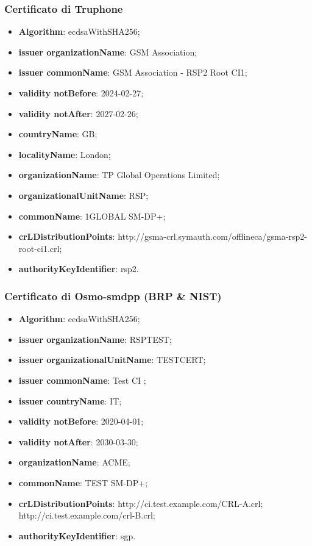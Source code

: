 \documentclass[10pt, oneside]{book}
\begin{document}
\subsubsection{Certificato di Truphone}
\begin{itemize}
\item \textbf{Algorithm}: ecdsaWithSHA256;
\item \textbf{issuer organizationName}: GSM Association;
\item \textbf{issuer commonName}: GSM Association - RSP2 Root CI1;
\item \textbf{validity notBefore}: 2024-02-27;
\item \textbf{validity notAfter}: 2027-02-26;
\item \textbf{countryName}: GB;
\item \textbf{localityName}: London;
\item \textbf{organizationName}: TP Global Operations Limited;
\item \textbf{organizationalUnitName}: RSP;
\item \textbf{commonName}: 1GLOBAL SM-DP+;
\item \textbf{crLDistributionPoints}: http://gsma-crl.symauth.com/offlineca/gsma-rsp2-root-ci1.crl;
\item \textbf{authorityKeyIdentifier}: rsp2.
\end{itemize}

\subsubsection{Certificato di Osmo-smdpp (BRP \& NIST)}
\begin{itemize}
\item \textbf{Algorithm}: ecdsaWithSHA256;
\item \textbf{issuer organizationName}: RSPTEST;
\item \textbf{issuer organizationalUnitName}: TESTCERT;
\item \textbf{issuer commonName}: Test CI ;
\item \textbf{issuer countryName}: IT;
\item \textbf{validity notBefore}: 2020-04-01;
\item \textbf{validity notAfter}: 2030-03-30;
\item \textbf{organizationName}: ACME;
\item \textbf{commonName}: TEST SM-DP+;
\item \textbf{crLDistributionPoints}: http://ci.test.example.com/CRL-A.crl;\\http://ci.test.example.com/crl-B.crl;
\item \textbf{authorityKeyIdentifier}: sgp.
\end{itemize}
\end{document}
